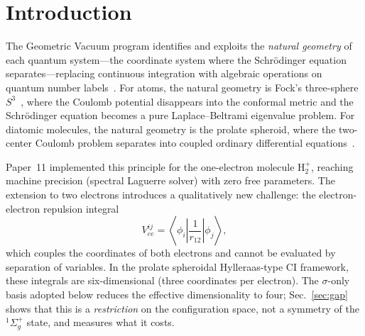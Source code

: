 \documentclass[aps,pra,twocolumn,superscriptaddress,longbibliography]{revtex4-2}
\begin{document}
\maketitle


\section{Introduction}
\label{sec:intro}

The Geometric Vacuum program identifies and exploits the
\emph{natural geometry} of each quantum system---the coordinate
system where the Schr\"odinger equation separates---replacing
continuous integration with algebraic operations on quantum number
labels~\cite{loutey_paper0, loutey_paper1, loutey_paper7}.  For
atoms, the natural geometry is Fock's three-sphere
$S^3$~\cite{Fock1935}, where the Coulomb potential disappears into
the conformal metric and the Schr\"odinger equation becomes a pure
Laplace--Beltrami eigenvalue problem.  For diatomic molecules, the
natural geometry is the prolate spheroid, where the two-center
Coulomb problem separates into coupled ordinary differential
equations~\cite{loutey_paper11}.

Paper~11 implemented this principle for the one-electron
molecule H$_2^+$, reaching machine precision (spectral Laguerre
solver) with zero free parameters.  The extension to two electrons introduces a
qualitatively new challenge: the electron-electron repulsion
integral
\begin{equation}
  V_{ee}^{ij} = \left\langle\phi_i\left|\frac{1}{r_{12}}\right|\phi_j\right\rangle,
  \label{eq:vee_element}
\end{equation}
which couples the coordinates of both electrons and cannot be
evaluated by separation of variables.  In the prolate spheroidal
Hylleraas-type CI framework, these integrals are six-dimensional
(three coordinates per electron).  The $\sigma$-only basis adopted
below reduces the effective dimensionality to four;
Sec.~\ref{sec:gap} shows that this is a \emph{restriction} on the
configuration space, not a symmetry of the $^1\Sigma_g^+$ state, and
measures what it costs.
\end{document}
